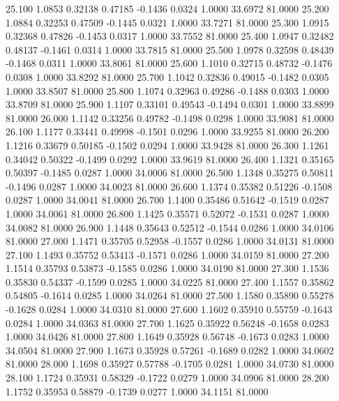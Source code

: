   25.100   1.0853   0.32138   0.47185  -0.1436   0.0324   1.0000  33.6972  81.0000
  25.200   1.0884   0.32253   0.47509  -0.1445   0.0321   1.0000  33.7271  81.0000
  25.300   1.0915   0.32368   0.47826  -0.1453   0.0317   1.0000  33.7552  81.0000
  25.400   1.0947   0.32482   0.48137  -0.1461   0.0314   1.0000  33.7815  81.0000
  25.500   1.0978   0.32598   0.48439  -0.1468   0.0311   1.0000  33.8061  81.0000
  25.600   1.1010   0.32715   0.48732  -0.1476   0.0308   1.0000  33.8292  81.0000
  25.700   1.1042   0.32836   0.49015  -0.1482   0.0305   1.0000  33.8507  81.0000
  25.800   1.1074   0.32963   0.49286  -0.1488   0.0303   1.0000  33.8709  81.0000
  25.900   1.1107   0.33101   0.49543  -0.1494   0.0301   1.0000  33.8899  81.0000
  26.000   1.1142   0.33256   0.49782  -0.1498   0.0298   1.0000  33.9081  81.0000
  26.100   1.1177   0.33441   0.49998  -0.1501   0.0296   1.0000  33.9255  81.0000
  26.200   1.1216   0.33679   0.50185  -0.1502   0.0294   1.0000  33.9428  81.0000
  26.300   1.1261   0.34042   0.50322  -0.1499   0.0292   1.0000  33.9619  81.0000
  26.400   1.1321   0.35165   0.50397  -0.1485   0.0287   1.0000  34.0006  81.0000
  26.500   1.1348   0.35275   0.50811  -0.1496   0.0287   1.0000  34.0023  81.0000
  26.600   1.1374   0.35382   0.51226  -0.1508   0.0287   1.0000  34.0041  81.0000
  26.700   1.1400   0.35486   0.51642  -0.1519   0.0287   1.0000  34.0061  81.0000
  26.800   1.1425   0.35571   0.52072  -0.1531   0.0287   1.0000  34.0082  81.0000
  26.900   1.1448   0.35643   0.52512  -0.1544   0.0286   1.0000  34.0106  81.0000
  27.000   1.1471   0.35705   0.52958  -0.1557   0.0286   1.0000  34.0131  81.0000
  27.100   1.1493   0.35752   0.53413  -0.1571   0.0286   1.0000  34.0159  81.0000
  27.200   1.1514   0.35793   0.53873  -0.1585   0.0286   1.0000  34.0190  81.0000
  27.300   1.1536   0.35830   0.54337  -0.1599   0.0285   1.0000  34.0225  81.0000
  27.400   1.1557   0.35862   0.54805  -0.1614   0.0285   1.0000  34.0264  81.0000
  27.500   1.1580   0.35890   0.55278  -0.1628   0.0284   1.0000  34.0310  81.0000
  27.600   1.1602   0.35910   0.55759  -0.1643   0.0284   1.0000  34.0363  81.0000
  27.700   1.1625   0.35922   0.56248  -0.1658   0.0283   1.0000  34.0426  81.0000
  27.800   1.1649   0.35928   0.56748  -0.1673   0.0283   1.0000  34.0504  81.0000
  27.900   1.1673   0.35928   0.57261  -0.1689   0.0282   1.0000  34.0602  81.0000
  28.000   1.1698   0.35927   0.57788  -0.1705   0.0281   1.0000  34.0730  81.0000
  28.100   1.1724   0.35931   0.58329  -0.1722   0.0279   1.0000  34.0906  81.0000
  28.200   1.1752   0.35953   0.58879  -0.1739   0.0277   1.0000  34.1151  81.0000
